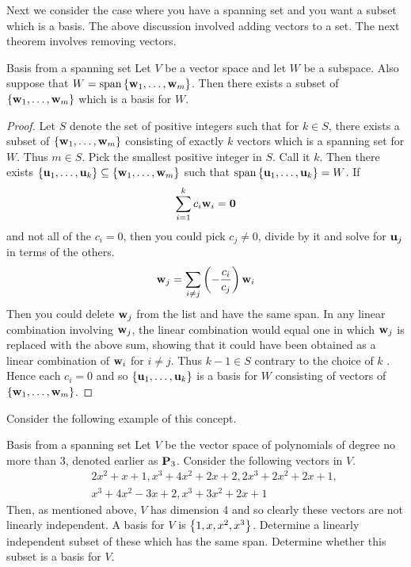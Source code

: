 Next we consider the case where you have a
spanning set and you want a subset which is a basis. The above discussion involved adding vectors to a set. The next theorem involves removing vectors.

\begin{theorem}{Basis from a spanning set}{}
Let $V$ be a vector space and let $W$ be a subspace. Also
suppose that $W=\sspan\set{\vect{w}_{1},\ldots,\vect{w}
_{m}}$. Then there exists a subset of $\left\{\mbox{\bf w}_{1},\ldots,
\mbox{\bf w}_{m}\right\} $ which is a basis for $W$.
\end{theorem}

\begin{proof}
Let $S$ denote the set of positive integers such that for $
k\in S$, there exists a subset of $\left\{\mbox{\bf w}_{1},\ldots,\mbox{\bf w}
_{m}\right\} $ consisting of exactly $k$ vectors which is a spanning set for
$W$. Thus $m\in S$. Pick the smallest positive integer in $S$. Call it $k$.
Then there exists $\left\{\mbox{\bf u}_{1},\ldots,\mbox{\bf u}_{k}\right\} \subseteq
\left\{\mbox{\bf w}_{1},\ldots,\mbox{\bf w}_{m}\right\} $ such that $\sspan
\set{\vect{u}_{1},\ldots,\vect{u}_{k}} =W$. If
\begin{equation*}
\sum_{i=1}^{k}c_{i}\mbox{\bf w}_{i}=\mbox{\bf 0}
\end{equation*}
and not all of the $c_{i}=0$, then you could pick $c_{j}\neq 0$, divide by
it and solve for $\mbox{\bf u}_{j}$ in terms of the others.
\begin{equation*}
\mbox{\bf w}_{j}=\sum_{i\neq j}\left(-\frac{c_{i}}{c_{j}}\right) \mbox{\bf w}_{i}
\end{equation*}
Then you could delete $\mbox{\bf w}_{j}$ from the list and have the same span.
In any linear combination involving $\mbox{\bf w}_{j}$, the linear
combination would equal one in which $\mbox{\bf w}_{j}$ is replaced with the
above sum, showing that it could have been obtained as a linear combination
of $\mbox{\bf w}_{i}$ for $i\neq j$. Thus $k-1\in S$ contrary to the choice of $k$
. Hence each $c_{i}=0$ and so $\left\{\mbox{\bf u}_{1},\ldots,\mbox{\bf u}
_{k}\right\} $ is a basis for $W$ consisting of vectors of $\left\{\mbox{\bf w}
_{1},\ldots,\mbox{\bf w}_{m}\right\}$.
\end{proof}

Consider the following example of this concept.

\begin{example}{Basis from a spanning set}{}
Let $V$ be the vector space of polynomials of degree no more than 3,
denoted earlier as $\mathbf{P}_{3}$. Consider the following vectors in $V$.
\begin{eqnarray*}
&&2x^{2}+x+1,x^{3}+4x^{2}+2x+2,2x^{3}+2x^{2}+2x+1, \\
&&x^{3}+4x^{2}-3x+2,x^{3}+3x^{2}+2x+1
\end{eqnarray*}
Then, as mentioned above, $V$ has dimension 4 and so clearly these vectors
are not linearly independent. A basis for $V$ is $\left\{
1,x,x^{2},x^{3}\right\}$. Determine a linearly independent subset of these
which has the same span. Determine whether this subset is a basis for $V$.
\end{example}

